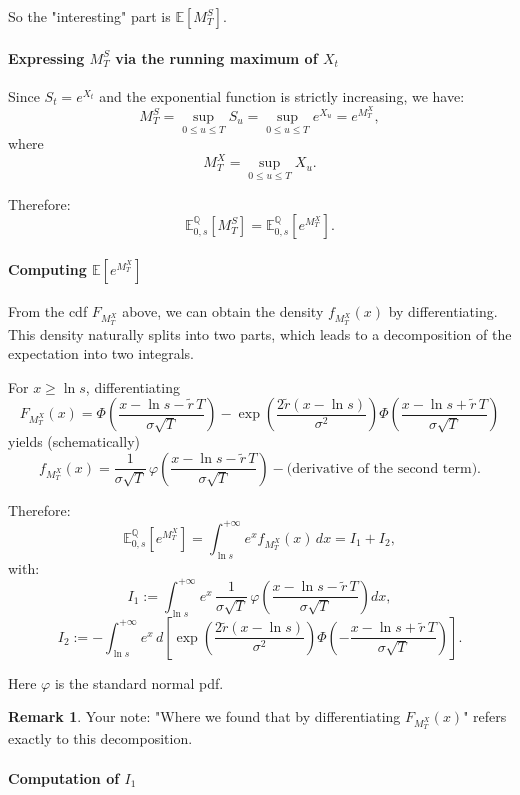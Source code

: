 \documentclass[12pt,a4paper]{article}
\theoremstyle{definition}
\newtheorem{remark}{Remark}[section]
\begin{document}
So the "interesting" part is $\mathbb{E}[M_T^S]$.

\paragraph{Expressing $M_T^S$ via the running maximum of $X_t$}

Since $S_t = e^{X_t}$ and the exponential function is strictly increasing, we have:
\[
M_T^S = \sup_{0 \leq u \leq T} S_u = \sup_{0 \leq u \leq T} e^{X_u} = e^{M_T^X},
\]
where
\[
M_T^X = \sup_{0 \leq u \leq T} X_u.
\]

Therefore:
\[
\mathbb{E}_{0,s}^{\mathbb{Q}}[M_T^S] = \mathbb{E}_{0,s}^{\mathbb{Q}}[e^{M_T^X}].
\]

\paragraph{Computing $\mathbb{E}[e^{M_T^X}]$}

From the cdf $F_{M_T^X}$ above, we can obtain the density $f_{M_T^X}(x)$ by differentiating. This density naturally splits into two parts, which leads to a decomposition of the expectation into two integrals.

For $x \geq \ln s$, differentiating
\[
F_{M_T^X}(x) = \Phi\!\left(\frac{x - \ln s - \widetilde{r}\, T}{\sigma\sqrt{T}}\right) - \exp\!\left(\frac{2\widetilde{r}(x - \ln s)}{\sigma^2}\right) \Phi\!\left(\frac{x - \ln s + \widetilde{r}\, T}{\sigma\sqrt{T}}\right)
\]
yields (schematically)
\[
f_{M_T^X}(x) = \frac{1}{\sigma\sqrt{T}}\, \varphi\!\left(\frac{x - \ln s - \widetilde{r}\, T}{\sigma\sqrt{T}}\right) - \text{(derivative of the second term)}.
\]

Therefore:
\[
\mathbb{E}_{0,s}^{\mathbb{Q}}[e^{M_T^X}] = \int_{\ln s}^{+\infty} e^x f_{M_T^X}(x)\, dx = I_1 + I_2,
\]
with:
\[
I_1 := \int_{\ln s}^{+\infty} e^x\, \frac{1}{\sigma\sqrt{T}}\, \varphi\!\left(\frac{x - \ln s - \widetilde{r}\, T}{\sigma\sqrt{T}}\right) dx,
\]
\[
I_2 := -\int_{\ln s}^{+\infty} e^x\, d\left[\exp\!\left(\frac{2\widetilde{r}(x - \ln s)}{\sigma^2}\right) \Phi\!\left(-\frac{x - \ln s + \widetilde{r}\, T}{\sigma\sqrt{T}}\right)\right].
\]

Here $\varphi$ is the standard normal pdf.

\begin{remark}
Your note: "Where we found that by differentiating $F_{M_T^X}(x)$" refers exactly to this decomposition.
\end{remark}

\paragraph{Computation of $I_1$}
\end{document}

